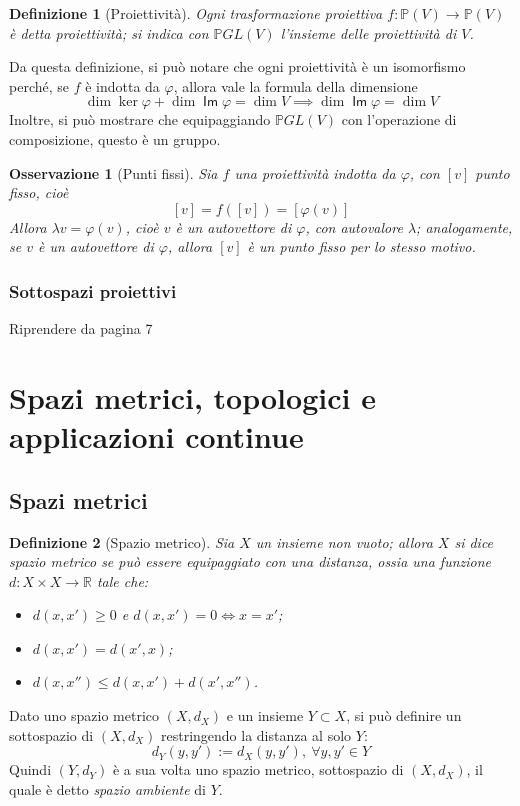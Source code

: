 \documentclass[11pt, a4paper]{scrartcl}
\theoremstyle{style1}
\newtheorem{osservazione}{Osservazione}[section]
\newtheorem{definizione}{Definizione}[section]
\numberwithin{equation}{subsection}
\renewcommand{\operatorname}[1]{\mathop{\mathrm{\textsf{#1}}}}
\begin{document}
\begin{definizione}
[Proiettivit\`a]
Ogni trasformazione proiettiva $f:\mathbb{P}(V) \to \mathbb{P}(V)$ \`e detta \textit{proiettivit\`a}; si indica con $\mathbb{P}GL(V)$ l'insieme delle proiettivit\`a di $V$.
\end{definizione}
\noindent Da questa definizione, si pu\`o notare che ogni proiettivit\`a \`e un isomorfismo perch\'e, se $f$ \`e indotta da $\varphi $, allora vale la formula della dimensione 
\[
	\dim \ker \varphi + \dim \operatorname{Im} \varphi = \dim V \implies \dim \operatorname{Im} \varphi  = \dim V
\] 
Inoltre, si pu\`o mostrare che equipaggiando $\mathbb{P}GL(V)$ con l'operazione di composizione, questo \`e un gruppo.
\begin{osservazione}
	[Punti fissi]
	Sia $f$ una proiettivit\`a indotta da $\varphi $, con $[v]$ punto fisso, cio\`e
	\[
		[v]  = f([v]) = [\varphi (v)]
	\] 
	Allora $\lambda v = \varphi (v)$, cio\`e $v$ \`e un autovettore di $\varphi $, con autovalore $\lambda $; analogamente, se $v$ \`e un autovettore di $\varphi $, allora $[v]$ \`e un punto fisso per lo stesso motivo.
\end{osservazione}
\subsubsection{Sottospazi proiettivi}
\begin{center}
	Riprendere da pagina 7
\end{center}













\newpage
\section{Spazi metrici, topologici e applicazioni continue}
\subsection{Spazi metrici}
\begin{definizione}
	[Spazio metrico]
Sia $X$ un insieme non vuoto; allora $X$ si dice spazio metrico se pu\`o essere equipaggiato con una \textit{distanza}, ossia una funzione $d : X \times X \to \mathbb{R}$ tale che:
\begin{itemize}
	\item $d(x,x') \ge  0 $ e $d(x,x') = 0 \iff x=x'$;
	\item $d(x,x') = d(x',x)$;
	\item $d(x,x'') \le  d(x,x') + d(x',x'')$.
\end{itemize}
\end{definizione}
\noindent Dato uno spazio metrico $(X,d_X)$ e un insieme $Y \subset  X$, si pu\`o definire un sottospazio di $(X,d_X)$ restringendo la distanza al solo $Y$:
\[
d_Y (y,y') := d_X(y,y'), \ \forall y,y' \in Y
\] 
Quindi $(Y,d_Y)$ \`e a sua volta uno spazio metrico, sottospazio di $(X,d_X)$, il quale \`e detto \textit{spazio ambiente} di $Y$.
\end{document}
